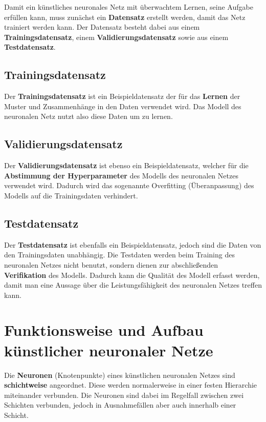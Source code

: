 Damit ein künstliches neuronales Netz mit überwachtem Lernen, seine Aufgabe erfüllen kann, muss zunächst ein \textbf{Datensatz} erstellt werden, damit das Netz trainiert werden kann. Der Datensatz besteht dabei aus einem \textbf{Trainingsdatensatz}, einem \textbf{Validierungsdatensatz} sowie aus einem \textbf{Testdatensatz}. \\

\subsection{Trainingsdatensatz}

Der \textbf{Trainingsdatensatz} ist ein Beispieldatensatz der für das \textbf{Lernen} der Muster und Zusammenhänge in den Daten verwendet wird. Das Modell des neuronalen Netz nutzt also diese Daten um zu lernen. \cite{datasolut} \\

\subsection{Validierungsdatensatz}

Der \textbf{Validierungsdatensatz} ist ebenso ein Beispieldatensatz, welcher für die \textbf{Abstimmung der Hyperparameter} des Modells des neuronalen Netzes verwendet wird. Dadurch wird das sogenannte \glqq Overfitting\grqq{} (Überanpassung) des Modells auf die Trainingsdaten verhindert. \cite{datasolut} \\

\subsection{Testdatensatz}

Der \textbf{Testdatensatz} ist ebenfalls ein Beispieldatensatz, jedoch sind die Daten von den Trainingsdaten unabhängig. Die Testdaten werden beim Training des neuronalen Netzes nicht benutzt, sondern dienen zur abschließenden \textbf{Verifikation} des Modells. Dadurch kann die Qualität des Modell erfasst werden, damit man eine Aussage über die Leistungsfähigkeit des neuronalen Netzes treffen kann. \cite{datasolut} \\

\section{Funktionsweise und Aufbau künstlicher neuronaler Netze}

Die \textbf{Neuronen} (Knotenpunkte) eines künstlichen neuronalen Netzes sind \textbf{schichtweise} angeordnet. Diese werden normalerweise in einer festen Hierarchie miteinander verbunden. Die Neuronen sind dabei im Regelfall zwischen zwei Schichten verbunden, jedoch in Ausnahmefällen aber auch innerhalb einer Schicht. \cite{jaai} \\

